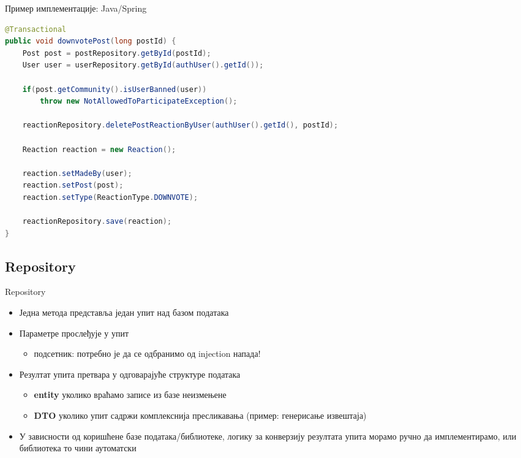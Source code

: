 \documentclass[aspectratio=169]{beamer}
\begin{document}
    \begin{frame}[fragile]{Пример имплементације: Java/Spring}
        \begin{adjustbox}{width=\textwidth,height=\textheight,keepaspectratio}
            \begin{lstlisting}[language=java]
@Transactional
public void downvotePost(long postId) {
    Post post = postRepository.getById(postId);
    User user = userRepository.getById(authUser().getId());

    if(post.getCommunity().isUserBanned(user))
        throw new NotAllowedToParticipateException();

    reactionRepository.deletePostReactionByUser(authUser().getId(), postId);

    Reaction reaction = new Reaction();

    reaction.setMadeBy(user);
    reaction.setPost(post);
    reaction.setType(ReactionType.DOWNVOTE);

    reactionRepository.save(reaction);
}
            \end{lstlisting}
        \end{adjustbox}
    \end{frame}
    
    \subsection[]{Repository}
    
    \begin{frame}{Repository}
        \begin{itemize}
            \item Једна метода представља један упит над базом података
            \item Параметре прослеђује у упит
            \begin{itemize}
                \item подсетник: потребно је да се одбранимо од injection напада!
            \end{itemize}
            \item Резултат упита претвара у одговарајуће структуре података
            \begin{itemize}
                \item \textbf{entity} уколико враћамо записе из базе неизмењене
                \item \textbf{DTO} уколико упит садржи комплекснија пресликавања (пример: генерисање извештаја)
            \end{itemize}
            \item У зависности од коришћене базе података/библиотеке, логику за конверзију резултата упита морамо ручно да имплементирамо, или библиотека то чини аутоматски
        \end{itemize}
    \end{frame}
    
\end{document}
